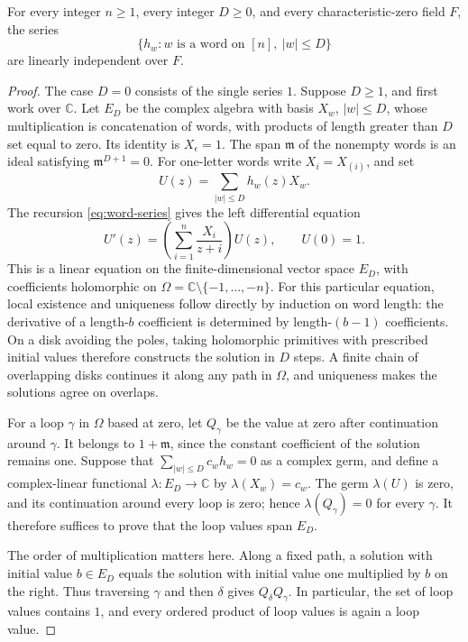 \begin{lemma}
\label{lem:word-independence}
For every integer $n\geq1$, every integer $D\geq0$, and every
characteristic-zero field $F$, the series
\[
  \{h_w: w\text{ is a word on }[n],\ |w|\leq D\}
\]
are linearly independent over $F$.
\end{lemma}

\begin{proof}
The case $D=0$ consists of the single series $1$.
Suppose $D\geq1$, and first work over $\mathbb C$.
Let $E_D$ be the complex algebra with basis $X_w$, $|w|\leq D$,
whose multiplication is concatenation of words, with products of length
greater than $D$ set equal to zero.
Its identity is $X_\epsilon=1$.
The span $\mathfrak m$ of the nonempty words is an ideal satisfying
$\mathfrak m^{D+1}=0$.
For one-letter words write $X_i=X_{(i)}$, and set
\[
  U(z)=\sum_{|w|\leq D}h_w(z)X_w.
\]
The recursion \eqref{eq:word-series} gives the left differential equation
\begin{equation}
  U'(z)=\left(\sum_{i=1}^n\frac{X_i}{z+i}\right)U(z),
  \qquad U(0)=1.
  \label{eq:word-differential-equation}
\end{equation}
This is a linear equation on the finite-dimensional vector space $E_D$,
with coefficients holomorphic on
$\Omega=\mathbb C\setminus\{-1,\ldots,-n\}$.
For this particular equation, local existence and uniqueness follow
directly by induction on word length: the derivative of a length-$b$
coefficient is determined by length-$(b-1)$ coefficients. On a disk
avoiding the poles, taking holomorphic primitives with prescribed initial
values therefore constructs the solution in $D$ steps.
A finite chain of overlapping disks continues it along any path in
$\Omega$, and uniqueness makes the solutions agree on overlaps.

For a loop $\gamma$ in $\Omega$ based at zero, let $Q_\gamma$ be the
value at zero after continuation around $\gamma$.
It belongs to $1+\mathfrak m$, since the constant coefficient of the
solution remains one.
Suppose that $\sum_{|w|\leq D}c_w h_w=0$ as a complex germ, and define
a complex-linear functional $\lambda:E_D\to\mathbb C$ by
$\lambda(X_w)=c_w$.
The germ $\lambda(U)$ is zero, and its continuation around every loop
is zero; hence $\lambda(Q_\gamma)=0$ for every $\gamma$.
It therefore suffices to prove that the loop values span $E_D$.

The order of multiplication matters here.
Along a fixed path, a solution with initial value $b\in E_D$ equals
the solution with initial value one multiplied by $b$ on the right.
Thus traversing $\gamma$ and then $\delta$ gives
$Q_\delta Q_\gamma$.
In particular, the set of loop values contains $1$, and every ordered
product of loop values is again a loop value.


\end{proof}
